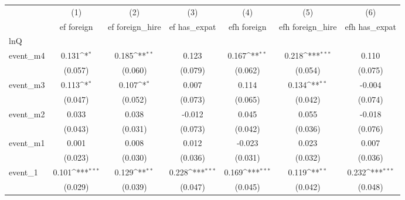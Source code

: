 {
\def\sym#1{\ifmmode^{#1}\else\(^{#1}\)\fi}
\begin{tabular}{l*{6}{c}}
\hline\hline
            &\multicolumn{1}{c}{(1)}&\multicolumn{1}{c}{(2)}&\multicolumn{1}{c}{(3)}&\multicolumn{1}{c}{(4)}&\multicolumn{1}{c}{(5)}&\multicolumn{1}{c}{(6)}\\
            &\multicolumn{1}{c}{ef foreign}&\multicolumn{1}{c}{ef foreign\_hire}&\multicolumn{1}{c}{ef has\_expat}&\multicolumn{1}{c}{efh foreign}&\multicolumn{1}{c}{efh foreign\_hire}&\multicolumn{1}{c}{efh has\_expat}\\
\hline
lnQ         &                     &                     &                     &                     &                     &                     \\
event\_m4    &       0.131\sym{*}  &       0.185\sym{**} &       0.123         &       0.167\sym{**} &       0.218\sym{***}&       0.110         \\
            &     (0.057)         &     (0.060)         &     (0.079)         &     (0.062)         &     (0.054)         &     (0.075)         \\
[1em]
event\_m3    &       0.113\sym{*}  &       0.107\sym{*}  &       0.007         &       0.114         &       0.134\sym{**} &      -0.004         \\
            &     (0.047)         &     (0.052)         &     (0.073)         &     (0.065)         &     (0.042)         &     (0.074)         \\
[1em]
event\_m2    &       0.033         &       0.038         &      -0.012         &       0.045         &       0.055         &      -0.018         \\
            &     (0.043)         &     (0.031)         &     (0.073)         &     (0.042)         &     (0.036)         &     (0.076)         \\
[1em]
event\_m1    &       0.001         &       0.008         &       0.012         &      -0.023         &       0.023         &       0.007         \\
            &     (0.023)         &     (0.030)         &     (0.036)         &     (0.031)         &     (0.032)         &     (0.036)         \\
[1em]
event\_1     &       0.101\sym{***}&       0.129\sym{**} &       0.228\sym{***}&       0.169\sym{***}&       0.119\sym{**} &       0.232\sym{***}\\
            &     (0.029)         &     (0.039)         &     (0.047)         &     (0.045)         &     (0.042)         &     (0.048)         \\

\end{tabular}}

